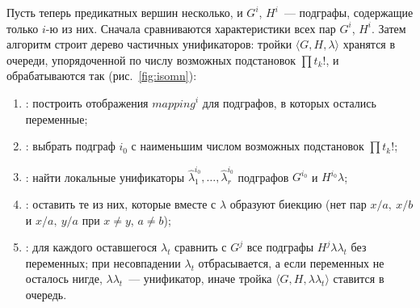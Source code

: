 Пусть теперь предикатных вершин несколько, и $G^i$, $H^i$~--- подграфы, содержащие только $i$-ю из них.
Сначала сравниваются характеристики всех пар $G^i$, $H^i$.
Затем алгоритм \ISOMn{} строит дерево частичных унификаторов: тройки $\langle G, H, \lambda \rangle$ хранятся в очереди, упорядоченной по числу возможных подстановок $\prod t_k!$, и обрабатываются так (рис.~\ref{fig:isomn}):
\begin{enumerate}
    \item {}: построить отображения $\mathit{mapping}^i$ для подграфов, в которых остались переменные;
    \item {}: выбрать подграф $i_0$ с наименьшим числом возможных подстановок $\prod t_k!$;
    \item \ISOMm{}: найти локальные унификаторы $\hat\lambda_1^{i_0}, \dots, \hat\lambda_r^{i_0}$ подграфов $G^{i_0}$ и $H^{i_0}\lambda$;
    \item {}: оставить те из них, которые вместе с $\lambda$ образуют биекцию (нет пар $x/a,\ x/b$ и $x/a,\ y/a$ при $x \ne y$, $a \ne b$);
    \item {}: для каждого оставшегося $\lambda_t$ сравнить с $G^j$ все подграфы $H^j\lambda\lambda_t$ без переменных; при несовпадении $\lambda_t$ отбрасывается, а если переменных не осталось нигде, $\lambda\lambda_t$~--- унификатор, иначе тройка $\langle G, H, \lambda\lambda_t \rangle$ ставится в очередь.
\end{enumerate}

